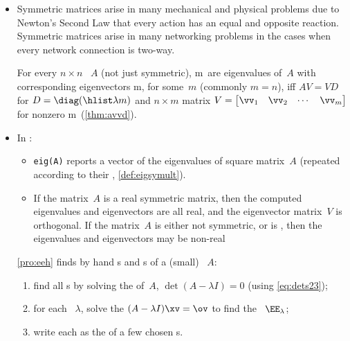 \begin{itemize}
\item Symmetric matrices arise in many mechanical and physical problems due to Newton's Second Law that every action has an equal and opposite reaction.
Symmetric matrices arise in many networking problems in the cases when every network connection is two-way. 

\itemme For every \(n\times n\) ~\(A\) (not just symmetric),
\hlist\lambda m\ are eigenvalues of~\(A\) with corresponding eigenvectors \hlist\vv m, for some~\(m\) (commonly \(m=n\)), iff \(AV=VD\) for  \(D=\diag(\hlist\lambda m)\) and \(n\times m\) matrix \(V=\begin{bmatrix} \vv_1&\vv_2&\cdots&\vv_m \end{bmatrix}\) for nonzero \hlist\vv m\ (\cref{thm:avvd}).

\item In \script:
\begin{itemize}
\itemhi {}\verb|[V,D]=eig(A)| computes eigenvectors and the eigenvalues of the  \(n\times n\) ~\(A\).
\begin{itemize}
\item The \(n\)~s of~\(A\) (repeated according to their , \cref{def:eigsymult}) form the diagonal of \(n\times n\) square matrix \(D=\diag(\hlist\lambda n)\).
\item Corresponding to the \(j\)th~eigenvalue~\(\lambda_j\), the \(j\)th~column of \(n\times n\) square matrix~\(V\) is an  (of unit length).
\end{itemize}
\item \verb|eig(A)| reports a vector of the eigenvalues of square matrix~\(A\) (repeated according to their  , \cref{def:eigsymult}).

\item If the matrix~\(A\) is a real symmetric matrix, then the computed eigenvalues and eigenvectors are all real, and the eigenvector matrix~\(V\) is orthogonal.
If the matrix~\(A\) is either not symmetric, or is , then the eigenvalues and eigenvectors may be non-real 

\end{itemize}


\itemme \cref{pro:eeh} finds by hand s and s of a (small) ~\(A\):
\begin{enumerate}
\item find all s by solving the  of~\(A\), \(\det(A-\lambda I)=0\) (using \eqref{eq:dets23});
\item for each ~\(\lambda\), solve the  \((A-\lambda I)\xv=\ov\) to find the ~\(\EE_\lambda\);
\item write each  as the  of a few chosen s.
\end{enumerate}






\end{itemize}

